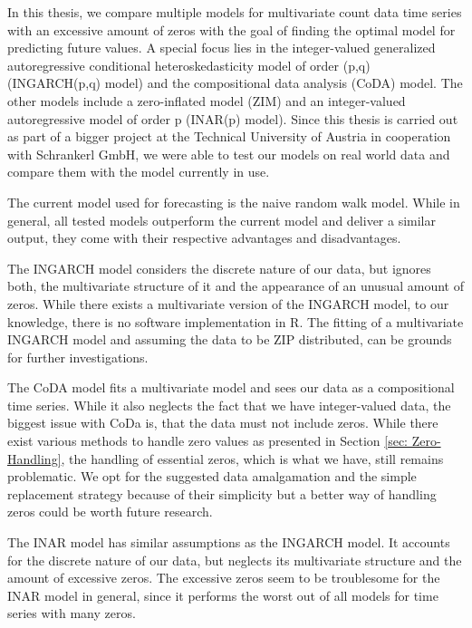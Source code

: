 In this thesis, we compare multiple models for multivariate count data time series with an excessive amount of zeros with the goal of finding the optimal model for predicting future values. A special focus lies in the integer-valued generalized autoregressive conditional heteroskedasticity model of order (p,q) (INGARCH(p,q) model) and the compositional data analysis (CoDA) model. The other models include a zero-inflated model (ZIM) and an integer-valued autoregressive model of order p (INAR(p) model). Since this thesis is carried out as part of a bigger project at the Technical University of Austria in cooperation with Schrankerl GmbH, we were able to test our models on real world data and compare them with the model currently in use. 

The current model used for forecasting is the naive random walk model. While in general, all tested models outperform the current model and deliver a similar output, they come with their respective advantages and disadvantages.

The INGARCH model considers the discrete nature of our data, but ignores both, the multivariate structure of it and the appearance of an unusual amount of zeros. While there exists a multivariate version of the INGARCH model, to our knowledge, there is no software implementation in R. The fitting of a multivariate INGARCH model and assuming the data to be ZIP distributed, can be grounds for further investigations. %

The CoDA model fits a multivariate model and sees our data as a compositional time series. While it also neglects the fact that we have integer-valued data, the biggest issue with CoDa is, that the data must not include zeros. While there exist various methods to handle zero values as presented in Section \ref{sec: Zero-Handling}, the handling of essential zeros, which is what we have, still remains problematic. We opt for the suggested data amalgamation and the simple replacement strategy because of their simplicity but a better way of handling zeros could be worth future research. 

The INAR model has similar assumptions as the INGARCH model. It accounts for the discrete nature of our data, but neglects its multivariate structure and the amount of excessive zeros. The excessive zeros seem to be troublesome for the INAR model in general, since it performs the worst out of all models for time series with many zeros. 

